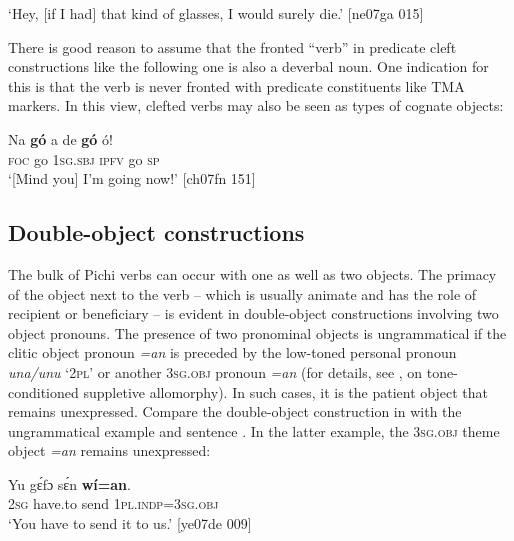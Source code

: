 \glt ‘Hey, [if I had] that kind of glasses, I would surely die.’ [ne07ga 015]
\z

There is good reason to assume that the fronted “verb” in predicate cleft constructions like the following one is also a deverbal noun. One indication for this is that the verb is never fronted with predicate constituents like TMA markers. In this view, clefted verbs may also be seen as types of cognate objects: 


\ea%
    \label{ex:key:1198}
    \gll Na  \textbf{gó}  a    de  \textbf{gó}  ó!\\
\textsc{foc}  go  \textsc{1sg.sbj}  \textsc{ipfv}  go  \textsc{sp}\\

\glt ‘[Mind you] I’m going now!’ [ch07fn 151]
\z

\subsection{Double-object constructions}\label{sec:9.3.4}

The bulk of Pichi verbs can occur with one as well as two objects. The primacy of the object next to the verb – which is usually animate and has the role of recipient or beneficiary – is evident in double-object constructions involving two object pronouns. The presence of two pronominal objects is ungrammatical if the clitic object pronoun \textit{=an} is preceded by the low-toned personal pronoun \textit{una/unu} ‘\textsc{2pl}’ or another \textsc{3sg.obj} pronoun \textit{=an} (for details, see , on tone-conditioned suppletive allomorphy). In such cases, it is the patient object that remains unexpressed. Compare the double-object construction in  with the ungrammatical example  and sentence . In the latter example, the \textsc{3sg.obj} theme object \textit{=an} remains unexpressed: 


\ea%
    \label{ex:key:1199}
    \gll Yu  gɛ́fɔ    sɛ́n    \textbf{wí=an}.\\
\textsc{2sg}  have.to  send  \textsc{1pl.indp}=\textsc{3sg.obj}\\

\glt ‘You have to send it to us.’ [ye07de 009]
\z


\z


